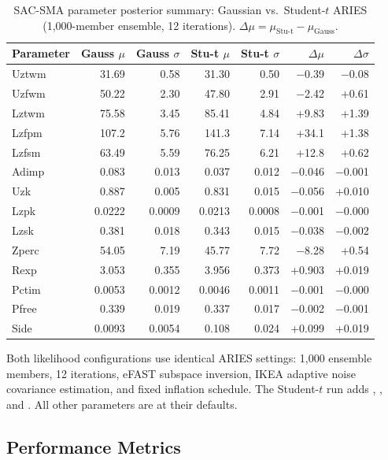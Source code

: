 \documentclass[article,nojss]{jss}
\begin{document}
\begin{table}[tbp]
\centering
\caption{SAC-SMA parameter posterior summary: Gaussian vs.\ Student-$t$
         ARIES (1,000-member ensemble, 12 iterations).
         $\Delta\mu = \mu_{\text{Stu-t}} - \mu_{\text{Gauss}}$.}
\label{tab:params}
\small
\begin{tabular}{l r r r r r r}
\toprule
Parameter & Gauss $\mu$ & Gauss $\sigma$ & Stu-t $\mu$ & Stu-t $\sigma$ & $\Delta\mu$ & $\Delta\sigma$ \\
\midrule
Uztwm    & 31.69 & 0.58 & 31.30 & 0.50 & $-$0.39 & $-$0.08 \\
Uzfwm    & 50.22 & 2.30 & 47.80 & 2.91 & $-$2.42 & +0.61 \\
Lztwm    & 75.58 & 3.45 & 85.41 & 4.84 & +9.83 & +1.39 \\
Lzfpm    & 107.2 & 5.76 & 141.3 & 7.14 & +34.1 & +1.38 \\
Lzfsm    & 63.49 & 5.59 & 76.25 & 6.21 & +12.8 & +0.62 \\
Adimp    & 0.083 & 0.013 & 0.037 & 0.012 & $-$0.046 & $-$0.001 \\
Uzk      & 0.887 & 0.005 & 0.831 & 0.015 & $-$0.056 & +0.010 \\
Lzpk     & 0.0222& 0.0009& 0.0213& 0.0008& $-$0.001& $-$0.000 \\
Lzsk     & 0.381 & 0.018 & 0.343 & 0.015 & $-$0.038 & $-$0.002 \\
Zperc    & 54.05 & 7.19 & 45.77 & 7.72 & $-$8.28 & +0.54 \\
Rexp     & 3.053 & 0.355 & 3.956 & 0.373 & +0.903 & +0.019 \\
Pctim    & 0.0053& 0.0012& 0.0046& 0.0011& $-$0.001& $-$0.000 \\
Pfree    & 0.339 & 0.019 & 0.337 & 0.017 & $-$0.002 & $-$0.001 \\
Side     & 0.0093& 0.0054& 0.108 & 0.024 & +0.099 & +0.019 \\
\bottomrule
\end{tabular}
\end{table}

Both likelihood configurations use identical ARIES settings: 1,000
ensemble members, 12 iterations, eFAST subspace inversion, IKEA adaptive
noise covariance estimation, and fixed inflation schedule.
The Student-$t$ run adds ,
, and .
All other parameters are at their defaults.

\subsection{Performance Metrics}
\end{document}
